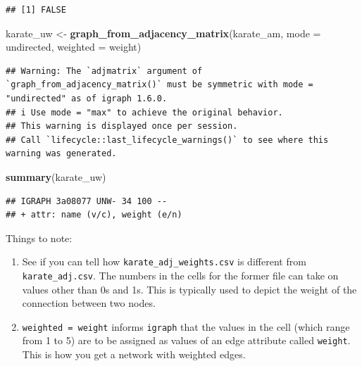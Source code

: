 \documentclass[
]{book}
\newenvironment{Shaded}{\begin{snugshade}}{\end{snugshade}}
\newcommand{\AttributeTok}[1]{\textcolor[rgb]{0.13,0.29,0.53}{#1}}
\newcommand{\FunctionTok}[1]{\textcolor[rgb]{0.13,0.29,0.53}{\textbf{#1}}}
\newcommand{\NormalTok}[1]{#1}
\newcommand{\OtherTok}[1]{\textcolor[rgb]{0.56,0.35,0.01}{#1}}
\newcommand{\StringTok}[1]{\textcolor[rgb]{0.31,0.60,0.02}{#1}}
\providecommand{\tightlist}{%
  \setlength{\itemsep}{0pt}\setlength{\parskip}{0pt}}
\begin{document}
\begin{verbatim}
## [1] FALSE
\end{verbatim}

\begin{Shaded}
\begin{Highlighting}[]
\NormalTok{karate\_uw }\OtherTok{\textless{}{-}} \FunctionTok{graph\_from\_adjacency\_matrix}\NormalTok{(karate\_am, }\AttributeTok{mode =} \StringTok{\textquotesingle{}undirected\textquotesingle{}}\NormalTok{, }\AttributeTok{weighted =} \StringTok{\textquotesingle{}weight\textquotesingle{}}\NormalTok{)}
\end{Highlighting}
\end{Shaded}

\begin{verbatim}
## Warning: The `adjmatrix` argument of `graph_from_adjacency_matrix()` must be symmetric with mode = "undirected" as of igraph 1.6.0.
## i Use mode = "max" to achieve the original behavior.
## This warning is displayed once per session.
## Call `lifecycle::last_lifecycle_warnings()` to see where this warning was generated.
\end{verbatim}

\begin{Shaded}
\begin{Highlighting}[]
\FunctionTok{summary}\NormalTok{(karate\_uw)}
\end{Highlighting}
\end{Shaded}

\begin{verbatim}
## IGRAPH 3a08077 UNW- 34 100 -- 
## + attr: name (v/c), weight (e/n)
\end{verbatim}

Things to note:

\begin{enumerate}
\def\labelenumi{\arabic{enumi}.}
\tightlist
\item
  See if you can tell how \texttt{karate\_adj\_weights.csv} is different from \texttt{karate\_adj.csv}. The numbers in the cells for the former file can take on values other than 0s and 1s. This is typically used to depict the weight of the connection between two nodes.
\item
  \texttt{weighted\ =\ \textquotesingle{}weight\textquotesingle{}} informs \texttt{igraph} that the values in the cell (which range from 1 to 5) are to be assigned as values of an edge attribute called \texttt{\textquotesingle{}weight\textquotesingle{}}. This is how you get a network with weighted edges.
\end{enumerate}
\end{document}
